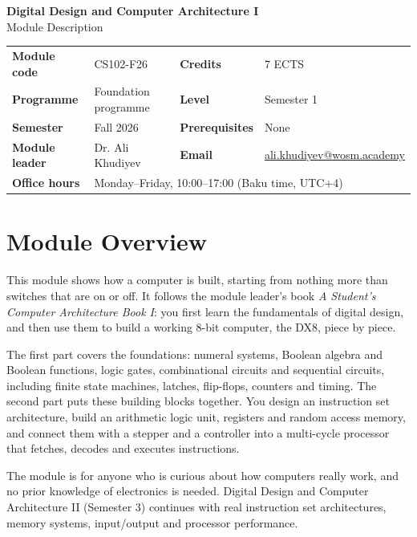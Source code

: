 \documentclass[11pt,a4paper]{article}
\makeatletter
\newcommand{\ModuleTitle}{Digital Design and Computer Architecture I}
\newcommand{\ModuleCode}{CS102-F26}
\newcommand{\Programme}{Foundation programme}
\newcommand{\Level}{Semester 1}
\newcommand{\Semester}{Fall 2026}
\newcommand{\Credits}{7 ECTS}
\newcommand{\ModuleLeader}{Dr. Ali Khudiyev}
\newcommand{\Email}{ali.khudiyev@wosm.academy}
\newcommand{\OfficeHours}{Monday--Friday, 10:00--17:00 (Baku time, UTC+4)}
\newcommand{\Prerequisites}{None}
\makeatother
\begin{document}
\begin{center}
  {\LARGE\bfseries\color{accent} \ModuleTitle}\\[4pt]
  {\large Module Description}
\end{center}
\vspace{6pt}

\begin{tabularx}{\textwidth}{>{\bfseries}l X >{\bfseries}l X}
\toprule
Module code   & \ModuleCode    & Credits      & \Credits \\
Programme     & \Programme     & Level        & \Level \\
Semester      & \Semester      & Prerequisites & \Prerequisites \\
Module leader & \ModuleLeader  & Email        & \href{mailto:\Email}{\Email} \\
Office hours  & \multicolumn{3}{l}{\OfficeHours} \\
\bottomrule
\end{tabularx}

\section{Module Overview}
This module shows how a computer is built, starting from nothing more than
switches that are on or off. It follows the module leader's book
\textit{A Student's Computer Architecture Book I}: you first learn the
fundamentals of digital design, and then use them to build a working 8-bit
computer, the DX8, piece by piece.

The first part covers the foundations: numeral systems, Boolean algebra and
Boolean functions, logic gates, combinational circuits and sequential circuits,
including finite state machines, latches, flip-flops, counters and timing. The
second part puts these building blocks together. You design an instruction set
architecture, build an arithmetic logic unit, registers and random access memory,
and connect them with a stepper and a controller into a multi-cycle processor that
fetches, decodes and executes instructions.

The module is for anyone who is curious about how computers really work, and no
prior knowledge of electronics is needed. Digital Design and Computer Architecture
II (Semester 3) continues with real instruction set architectures, memory systems,
input/output and processor performance.
\end{document}
